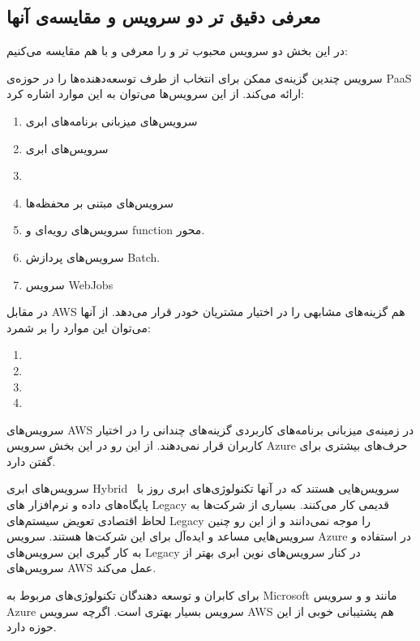 \subsection{معرفی دقیق تر دو سرویس و مقایسه‌ی آنها}
 در این بخش دو سرویس محبوب تر  و  را معرفی و با هم مقایسه می‌کنیم:

سرویس  چندین گزینه‌ی ممکن برای انتخاب از طرف توسعه‌دهنده‌ها را در حوزه‌ی PaaS ارائه می‌کند. از این سرویس‌ها می‌توان به  این موارد اشاره کرد:
\begin{enumerate}
\item سرویس‌های میزبانی برنامه‌های ابری 
\item سرویس‌های ابری 
\item {}
\item سرویس‌های مبتنی بر محفظه‌ها 
\item سرویس‌های رویه‌ای و function محور.
\item سرویس‌های پردازش Batch.
\item سرویس WebJobs
\end{enumerate}

در مقابل AWS هم گزینه‌های مشابهی را در اختیار مشتریان خودر قرار می‌دهد. از آنها می‌توان این موارد را بر شمرد:
\begin{enumerate}
\item {}
\item {}
\item {}
\item {}
\end{enumerate}

سرویس‌های AWS در زمینه‌ی میزبانی برنامه‌های کاربردی گزینه‌های چندانی را در اختیار کاربران قرار نمی‌دهند. از این رو در این بخش سرویس Azure حرف‌های بیشتری برای گفتن دارد.

سرویس‌های ابری Hybrid  سرویس‌هایی هستند که در آنها تکنولوژی‌های ابری روز با پایگاه‌های داده و نرم‌افزار های Legacy قدیمی کار می‌کنند.  بسیاری از شرکت‌ها به لحاظ اقتصادی تعویض سیستم‌های Legacy را موجه نمی‌دانند و از این رو چنین سرویس‌هایی مساعد و ایده‌آل برای این شرکت‌ها هستند. سرویس Azure در استفاده و به کار گیری این سرویس‌های Legacy در کنار سرویس‌های نوین ابری بهتر از سرویس‌های AWS عمل می‌کند.

برای کابران و توسعه دهندگان تکنولوژی‌های مربوط به Microsoft مانند  
و 
و
سرویس Azure سرویس بسیار بهتری است. اگرچه سرویس ‌AWS هم پشتیبانی خوبی از این حوزه دارد.

